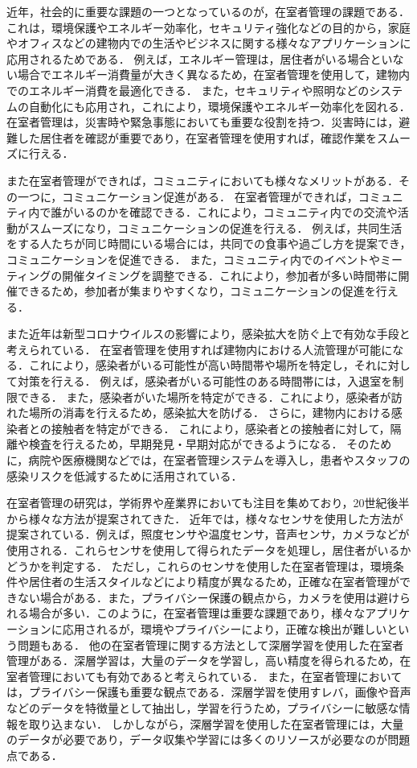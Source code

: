 近年，社会的に重要な課題の一つとなっているのが，在室者管理の課題である．
これは，環境保護やエネルギー効率化，セキュリティ強化などの目的から，家庭やオフィスなどの建物内での生活やビジネスに関する様々なアプリケーションに応用されるためである．
例えば，エネルギー管理は，居住者がいる場合といない場合でエネルギー消費量が大きく異なるため，在室者管理を使用して，建物内でのエネルギー消費を最適化できる．
また，セキュリティや照明などのシステムの自動化にも応用され，これにより，環境保護やエネルギー効率化を図れる．
在室者管理は，災害時や緊急事態においても重要な役割を持つ．災害時には，避難した居住者を確認が重要であり，在室者管理を使用すれば，確認作業をスムーズに行える．

また在室者管理ができれば，コミュニティにおいても様々なメリットがある．その一つに，コミュニケーション促進がある．
在室者管理ができれば，コミュニティ内で誰がいるのかを確認できる．これにより，コミュニティ内での交流や活動がスムーズになり，コミュニケーションの促進を行える．
例えば，共同生活をする人たちが同じ時間にいる場合には，共同での食事や過ごし方を提案でき，コミュニケーションを促進できる．
また，コミュニティ内でのイベントやミーティングの開催タイミングを調整できる．これにより，参加者が多い時間帯に開催できるため，参加者が集まりやすくなり，コミュニケーションの促進を行える．


また近年は新型コロナウイルスの影響により，感染拡大を防ぐ上で有効な手段と考えられている．
在室者管理を使用すれば建物内における人流管理が可能になる．これにより，感染者がいる可能性が高い時間帯や場所を特定し，それに対して対策を行える．
例えば，感染者がいる可能性のある時間帯には，入退室を制限できる．
また，感染者がいた場所を特定ができる．これにより，感染者が訪れた場所の消毒を行えるため，感染拡大を防げる．
さらに，建物内における感染者との接触者を特定ができる．
これにより，感染者との接触者に対して，隔離や検査を行えるため，早期発見・早期対応ができるようになる．
そのために，病院や医療機関などでは，在室者管理システムを導入し，患者やスタッフの感染リスクを低減するために活用されている．

在室者管理の研究は，学術界や産業界においても注目を集めており，20世紀後半から様々な方法が提案されてきた．
近年では，様々なセンサを使用した方法が提案されている．例えば，照度センサや温度センサ，音声センサ，カメラなどが使用される．これらセンサを使用して得られたデータを処理し，居住者がいるかどうかを判定する．
ただし，これらのセンサを使用した在室者管理は，環境条件や居住者の生活スタイルなどにより精度が異なるため，正確な在室者管理ができない場合がある．また，プライバシー保護の観点から，カメラを使用は避けられる場合が多い．このように，在室者管理は重要な課題であり，様々なアプリケーションに応用されるが，環境やプライバシーにより，正確な検出が難しいという問題もある．
他の在室者管理に関する方法として深層学習を使用した在室者管理がある．深層学習は，大量のデータを学習し，高い精度を得られるため，在室者管理においても有効であると考えられている．
また，在室者管理においては，プライバシー保護も重要な観点である．深層学習を使用すレバ，画像や音声などのデータを特徴量として抽出し，学習を行うため，プライバシーに敏感な情報を取り込まない．
しかしながら，深層学習を使用した在室者管理には，大量のデータが必要であり，データ収集や学習には多くのリソースが必要なのが問題点である．

